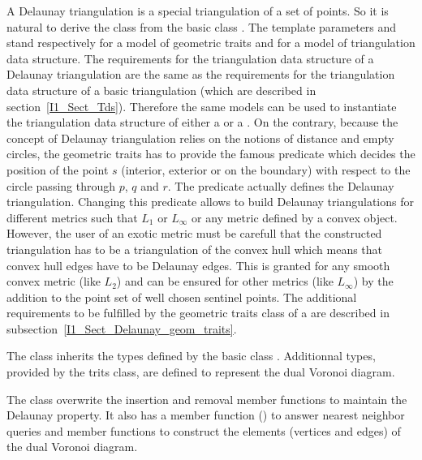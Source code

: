 A Delaunay triangulation is a special triangulation of a set of points.
So it is natural to derive  the class 
from the basic class .
The template parameters  and  stand 
respectively
for a model of geometric traits and for a model of triangulation data structure.
The requirements for the triangulation data structure
of a Delaunay triangulation are
the same as the requirements for the triangulation data structure
of a basic triangulation (which are described in
section~\ref{I1_Sect_Tds}).
Therefore the same models
 can be used to instantiate the
triangulation data structure of either a 
or a . On the contrary, because the
concept of Delaunay triangulation relies on the notions of
distance and  
empty circles, 
the geometric traits has to provide
the famous  predicate
which decides the position of  the point $s$ (interior, exterior
or on the boundary) with respect to the circle
passing through $p$, $q$ and $r$. The 
predicate actually defines the Delaunay triangulation.
Changing this predicate 
allows to build Delaunay triangulations for different metrics
such that $L_1$ or $L_{\infty}$ or any metric defined by a
convex object. However, the user of an exotic metric
must be carefull that the constructed triangulation 
has to be a triangulation of the convex hull
which means that convex hull edges have to be Delaunay edges.
This is granted for any smooth convex metric (like $L_2$)
and can be ensured for other metrics (like  $L_{\infty}$)
by the addition to the point set of well chosen sentinel points.
The additional requirements
to be fulfilled by the geometric traits class
of a  are described in 
subsection~\ref{I1_Sect_Delaunay_geom_traits}. 


The class 
inherits the types defined by the 
basic class .
Additionnal types, provided by the trits class,
are defined to represent the dual Voronoi diagram.
\ccGlue
{}
\ccGlue
{}

The class 
overwrite the insertion and removal  member functions
to maintain the Delaunay property.
It also has a member function ()
to answer nearest neighbor queries
and member functions to construct the elements (vertices and edges)
of the dual Voronoi diagram.

